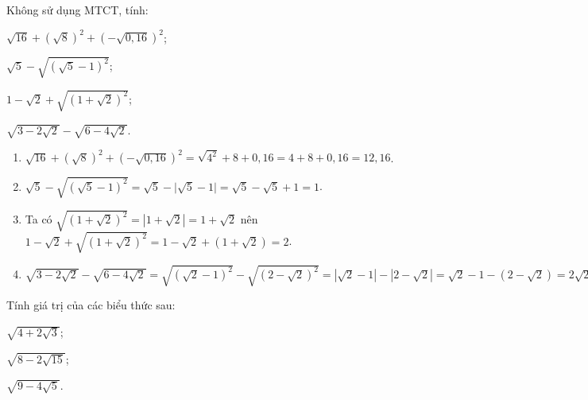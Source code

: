 \begin{vd}
	Không sử dụng MTCT, tính:
	\begin{listEX}[2]
	\item $\sqrt{16}+(\sqrt{8})^{2}+(-\sqrt{0{,}16})^{2}$;
	\item $\sqrt{5}-\sqrt{(\sqrt{5}-1)^2}$;
	\item $1-\sqrt{2}+\sqrt{\left(1+\sqrt{2}\right)^2}$;
	\item $\sqrt{3 - 2\sqrt{2}} - \sqrt{6 - 4\sqrt{2}}$.
	\end{listEX}
	\loigiai
	{
	\begin{enumerate}
	\item $\sqrt{16}+(\sqrt{8})^{2}+(-\sqrt{0{,}16})^{2}=\sqrt{4^{2}}+8+0{,}16=4+8+0{,}16=12{,}16$.
	\item $\sqrt{5}-\sqrt{(\sqrt{5}-1)^2}=\sqrt{5}-\big|\sqrt{5}-1\big|=\sqrt{5}-\sqrt{5}+1=1$.
	\item Ta có $\sqrt{(1+\sqrt{2})^2}=|1+\sqrt{2}|=1+\sqrt{2}$ nên $1-\sqrt{2}+\sqrt{(1+\sqrt{2})^2}=1-\sqrt{2}+(1+\sqrt{2})=2$.
	\item $\sqrt{3 - 2\sqrt{2}} - \sqrt{6 - 4\sqrt{2}}=\sqrt{(\sqrt{2} - 1)^2} - \sqrt{(2 - \sqrt{2})^2}= |\sqrt{2} - 1 | - | 2 - \sqrt{2}| =\sqrt{2} - 1 - \left(2 - \sqrt{2}\right) = 2\sqrt{2} - 3$
	\end{enumerate}	
	}
\end{vd}
\begin{vd}%
	Tính giá trị của các biểu thức sau:
	\begin{listEX}[3]
	\item $\sqrt{4+2 \sqrt{3}}$; 
	\item $\sqrt{8-2 \sqrt{15}}$;
	\item $\sqrt{9-4 \sqrt{5}}$.
	\end{listEX}
\end{vd}
